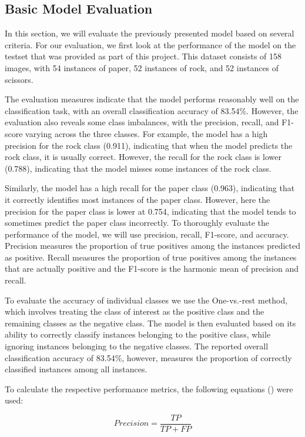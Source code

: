 \documentclass[a4paper]{article}
\begin{document}
\subsection{Basic Model Evaluation} \label{sec:basicEval}
In this section, we will evaluate the previously presented model based on several criteria. For our evaluation, we first look at the performance of the model on the testset that was provided as part of this project. This dataset consists of 158 images, with 54 instances of paper, 52 instances of rock, and 52 instances of scissors.

The evaluation measures indicate that the model performs reasonably well on the classification task, with an overall classification accuracy of 83.54\%. However, the evaluation also reveals some class imbalances, with the precision, recall, and F1-score varying across the three classes. 
For example, the model has a high precision for the rock class (0.911), indicating that when the model predicts the rock class, it is usually correct. However, the recall for the rock class is lower (0.788), indicating that the model misses some instances of the rock class.

Similarly, the model has a high recall for the paper class (0.963), indicating that it correctly identifies most instances of the paper class. However, here the precision for the paper class is lower at 0.754, indicating that the model tends to sometimes predict the paper class incorrectly.
To thoroughly evaluate the performance of the model, we will use precision, recall, F1-score, and accuracy. Precision measures the proportion of true positives among the instances predicted as positive. Recall measures the proportion of true positives among the instances that are actually positive and the F1-score is the harmonic mean of precision and recall. 

To evaluate the accuracy of individual classes we use the One-vs.-rest method, which involves treating the class of interest as the positive class and the remaining classes as the negative class. The model is then evaluated based on its ability to correctly classify instances belonging to the positive class, while ignoring instances belonging to the negative classes. The reported overall classification accuracy of 83.54\%, however, measures the proportion of correctly classified instances among all instances.

To calculate the respective performance metrics, the following equations (\cite{metric_formulas}) were used:

\begin{equation}
	Precision = \frac{TP}{TP + FP}
\end{equation}
\end{document}
